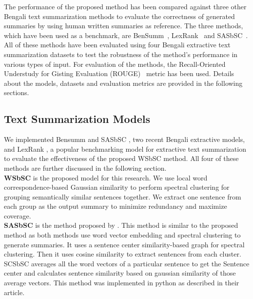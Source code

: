 The performance of the proposed method has been compared against three other Bengali text summarization methods to evaluate the correctness of generated summaries by using human written summaries as reference. The three methods, which have been used as a benchmark, are BenSumm~\cite{chowdhury-etal-2021-tfidf-clustering}, LexRank~\cite{Erkan-lexRank-2004} and SASbSC~\cite{roychowdhury-etal-2022-spectral-base}. All of these methods have been evaluated using four Bengali extractive text summarization datasets to test the robustness of the method's performance in various types of input. For evaluation of the methods, the Recall-Oriented Understudy for Gisting Evaluation (ROUGE)~\cite{lin-2004-rouge} metric has been used. Details about the models, datasets and evaluation metrics are provided in the following sections.

\subsection{Text Summarization Models}\label{subsec:text-summarization-models}
We implemented Bensumm \cite{chowdhury-etal-2021-tfidf-clustering} and SASbSC \cite{roychowdhury-etal-2022-spectral-base}, two recent Bengali extractive models, and LexRank \cite{Erkan-lexRank-2004}, a popular benchmarking model for extractive text summarization to evaluate the effectiveness of the proposed WSbSC method. All four of these methods are further discussed in the following section.\\

\textbf{WSbSC} is the proposed model for this research. We use local word correspondence-based Gaussian similarity to perform spectral clustering for grouping semantically similar sentences together. We extract one sentence from each group as the output summary to minimize redundancy and maximize coverage.\\

\textbf{SASbSC} is the method proposed by \citeauthor{roychowdhury-etal-2022-spectral-base} \cite{roychowdhury-etal-2022-spectral-base}. This method is similar to the proposed method as both methods use word vector embedding and spectral clustering to generate summaries. It uses a sentence center similarity-based graph for spectral clustering. Then it uses cosine similarity to extract sentences from each cluster. SCSbSC averages all the word vectors of a particular sentence to get the Sentence center and calculates sentence similarity based on gaussian similarity of those average vectors. This method was implemented in python as described in their article.\\

